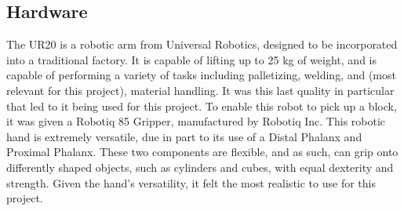 \documentclass[journal]{new-aiaa}
\begin{document}
\subsection{Hardware}\label{sec:Robot Design:Hardware}

The UR20 is a robotic arm from Universal Robotics, designed to be incorporated into a traditional factory. 
It is capable of lifting up to 25 kg of weight, and is capable of performing a variety of tasks including palletizing, welding, and (most relevant for this project), material handling. 
It was this last quality in particular that led to it being used for this project. 
To enable this robot to pick up a block, it was given a Robotiq 85 Gripper, manufactured by Robotiq Inc. 
This robotic hand is extremely versatile, due in part to its use of a Distal Phalanx and Proximal Phalanx. 
These two components are flexible, and as such, can grip onto differently shaped objects, such as cylinders and cubes, with equal dexterity and strength. 
Given the hand's versatility, it felt the most realistic to use for this project. 
\end{document}
